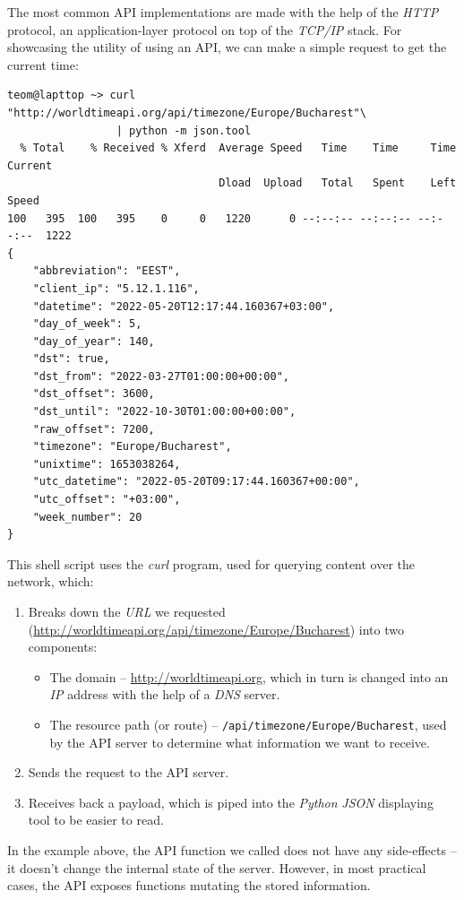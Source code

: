 \documentclass[11pt, a4paper]{report}
\def\code#1{\texttt{#1}}
\begin{document}
The most common API implementations are made with the help of the \textit{HTTP} protocol, an application-layer protocol on top of the \textit{TCP/IP} stack. For showcasing the utility of using an API, we can make a simple request to get the current time:

\begin{verbatim}
teom@lapttop ~> curl "http://worldtimeapi.org/api/timezone/Europe/Bucharest"\
                 | python -m json.tool
  % Total    % Received % Xferd  Average Speed   Time    Time     Time  Current
                                 Dload  Upload   Total   Spent    Left  Speed
100   395  100   395    0     0   1220      0 --:--:-- --:--:-- --:--:--  1222
{
    "abbreviation": "EEST",
    "client_ip": "5.12.1.116",
    "datetime": "2022-05-20T12:17:44.160367+03:00",
    "day_of_week": 5,
    "day_of_year": 140,
    "dst": true,
    "dst_from": "2022-03-27T01:00:00+00:00",
    "dst_offset": 3600,
    "dst_until": "2022-10-30T01:00:00+00:00",
    "raw_offset": 7200,
    "timezone": "Europe/Bucharest",
    "unixtime": 1653038264,
    "utc_datetime": "2022-05-20T09:17:44.160367+00:00",
    "utc_offset": "+03:00",
    "week_number": 20
}
\end{verbatim}

This shell script uses the \textit{curl} program, used for querying content over the network, which:
\begin{enumerate}
    \item Breaks down the \textit{URL} we requested (\url{http://worldtimeapi.org/api/timezone/Europe/Bucharest}) into two components:
    \begin{itemize}
        \item The domain -- \url{http://worldtimeapi.org}, which in turn is changed into an \textit{IP} address with the help of a \textit{DNS} server.
        \item The resource path (or route) -- \code{/api/timezone/Europe/Bucharest}, used by the API server to determine what information we want to receive.
    \end{itemize}
    \item Sends the request to the API server.
    \item Receives back a payload, which is piped into the \textit{Python} \textit{JSON} displaying tool to be easier to read.
\end{enumerate}

In the example above, the API function we called does not have any side-effects -- it doesn't change the internal state of the server. However, in most practical cases, the API exposes functions mutating the stored information.
\end{document}
